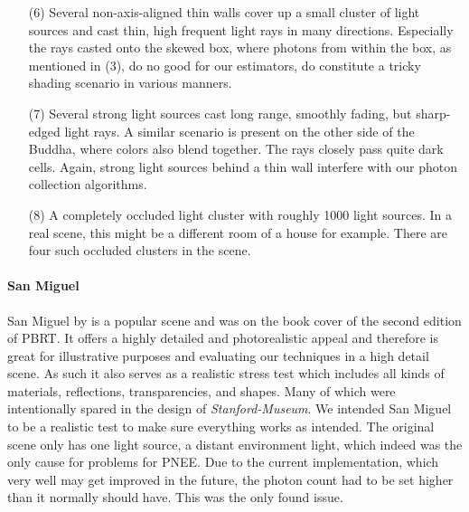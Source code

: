 \begin{itemize}
    \item[(6)] Several non-axis-aligned thin walls cover up a small cluster of light sources and cast thin, high frequent light rays in many directions. Especially the rays casted onto the skewed box, where photons from within the box, as mentioned in (3), do no good for our estimators, do constitute a tricky shading scenario in various manners.
    \item[(7)] Several strong light sources cast long range, smoothly fading, but sharp-edged light rays. A similar scenario is present on the other side of the Buddha, where colors also blend together. The rays closely pass quite dark cells. Again, strong light sources behind a thin wall interfere with our photon collection algorithms.
    \item[(8)] A completely occluded light cluster with roughly 1000 light sources. In a real scene, this might be a different room of a house for example. There are four such occluded clusters in the scene.
\label{li:stanfordmuseum}
\end{itemize}
\paragraph{San Miguel}
\label{sec:sanmiguel}
San Miguel by \textcite{Sanmiguel} is a popular scene and was on the book cover of the second edition of PBRT. It offers a highly detailed and photorealistic appeal and therefore is great for illustrative purposes and evaluating our techniques in a high detail scene. As such it also serves as a realistic stress test which includes all kinds of materials, reflections, transparencies, and shapes. Many of which were intentionally spared in the design of \textit{Stanford-Museum}. We intended San Miguel to be a realistic test to make sure everything works as intended. The original scene only has one light source, a distant environment light, which indeed was the only cause for problems for PNEE. Due to the current implementation, which very well may get improved in the future, the photon count had to be set higher than it normally should have. This was the only found issue.

